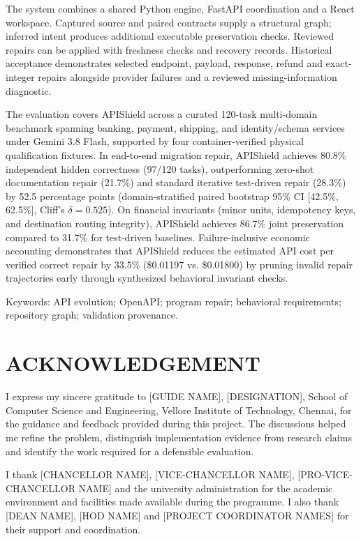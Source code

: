 \documentclass[12pt,a4paper,oneside]{report}
\newcommand{\frontchapter}[1]{\chapter*{#1}\addcontentsline{toc}{chapter}{#1}}
\begin{document}
The system combines a shared Python engine, FastAPI coordination and a React workspace. Captured source and paired contracts supply a structural graph; inferred intent produces additional executable preservation checks. Reviewed repairs can be applied with freshness checks and recovery records. Historical acceptance demonstrates selected endpoint, payload, response, refund and exact-integer repairs alongside provider failures and a reviewed missing-information diagnostic.\par

The evaluation covers APIShield across a curated 120-task multi-domain benchmark spanning banking, payment, shipping, and identity/schema services under Gemini 3.8 Flash, supported by four container-verified physical qualification fixtures. In end-to-end migration repair, APIShield achieves 80.8\% independent hidden correctness (97/120 tasks), outperforming zero-shot documentation repair (21.7\%) and standard iterative test-driven repair (28.3\%) by 52.5 percentage points (domain-stratified paired bootstrap 95\% CI [42.5\%, 62.5\%], Cliff's $\delta = 0.525$). On financial invariants (minor units, idempotency keys, and destination routing integrity), APIShield achieves 86.7\% joint preservation compared to 31.7\% for test-driven baselines. Failure-inclusive economic accounting demonstrates that APIShield reduces the estimated API cost per verified correct repair by 33.5\% (\$0.01197 vs. \$0.01800) by pruning invalid repair trajectories early through synthesized behavioral invariant checks.\par

Keywords: API evolution; OpenAPI; program repair; behavioral requirements; repository graph; validation provenance.\par

\frontchapter{ACKNOWLEDGEMENT}
I express my sincere gratitude to [GUIDE NAME], [DESIGNATION], School of Computer Science and Engineering, Vellore Institute of Technology, Chennai, for the guidance and feedback provided during this project. The discussions helped me refine the problem, distinguish implementation evidence from research claims and identify the work required for a defensible evaluation.\par

I thank [CHANCELLOR NAME], [VICE-CHANCELLOR NAME], [PRO-VICE-CHANCELLOR NAME] and the university administration for the academic environment and facilities made available during the programme. I also thank [DEAN NAME], [HOD NAME] and [PROJECT COORDINATOR NAMES] for their support and coordination.\par
\end{document}
